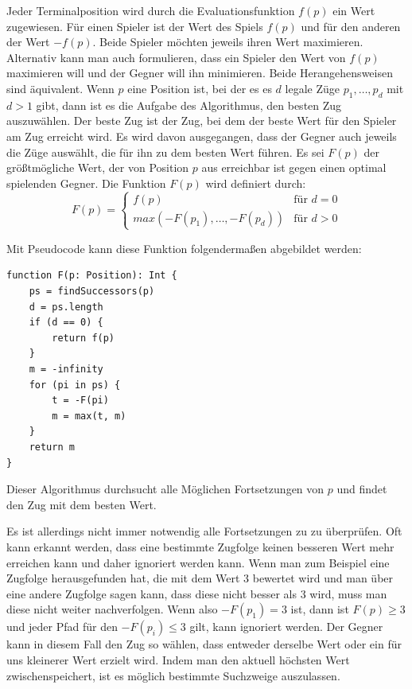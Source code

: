Jeder Terminalposition wird durch die Evaluationsfunktion $f(p)$ ein Wert zugewiesen. Für einen Spieler ist der Wert des Spiels $f(p)$ und für den anderen der Wert $-f(p)$. Beide Spieler möchten jeweils ihren Wert maximieren. Alternativ kann man auch formulieren, dass ein Spieler den Wert von $f(p)$ maximieren will und der Gegner will ihn minimieren.
Beide Herangehensweisen sind äquivalent. Wenn $p$ eine Position ist, bei der es es $d$ legale Züge $p_1,\ldots,p_d$ mit $d > 1$ gibt, dann ist es die Aufgabe des Algorithmus, den besten Zug auszuwählen. Der beste Zug ist der Zug, bei dem der beste Wert für den Spieler am Zug erreicht wird. Es wird davon ausgegangen, dass der Gegner auch jeweils die Züge auswählt, die für ihn zu dem besten Wert führen. Es sei $F(p)$ der größtmögliche Wert, der von Position $p$ aus erreichbar ist gegen einen optimal spielenden Gegner. Die Funktion $F(p)$ wird definiert durch:
\begin{equation*}
    F(p) = 
    \begin{cases}
        f(p) & \text{für } d = 0 \\
        max(-F(p_1),\ldots,-F(p_d)) & \text{für } d > 0
    \end{cases}
\end{equation*}

Mit Pseudocode kann diese Funktion folgendermaßen abgebildet werden:
\begin{lstlisting}[caption=Minimax-Algorithmus,label=lst:minmax]
function F(p: Position): Int {
    ps = findSuccessors(p)
    d = ps.length
    if (d == 0) {
        return f(p)
    }
    m = -infinity
    for (pi in ps) {
        t = -F(pi)
        m = max(t, m)
    }
    return m
}
\end{lstlisting}

Dieser Algorithmus durchsucht alle Möglichen Fortsetzungen von $p$ und findet den Zug mit dem besten Wert. 
\cite{knuth_analysis_1975}

Es ist allerdings nicht immer notwendig alle Fortsetzungen zu zu überprüfen. Oft kann erkannt werden, dass eine bestimmte Zugfolge keinen besseren Wert mehr erreichen kann und daher ignoriert werden kann.
Wenn man zum Beispiel eine Zugfolge herausgefunden hat, die mit dem Wert 3 bewertet wird und man über eine andere Zugfolge sagen kann, dass diese nicht besser als 3 wird, muss man diese nicht weiter nachverfolgen. Wenn also $-F(p_1) = 3$ ist, dann ist $F(p) \geq 3$ und jeder Pfad für den $-F(p_i) \leq 3$ gilt, kann ignoriert werden.
Der Gegner kann in diesem Fall den Zug so wählen, dass entweder derselbe Wert oder ein für uns kleinerer Wert erzielt wird. Indem man den aktuell höchsten Wert zwischenspeichert, ist es möglich bestimmte Suchzweige auszulassen.
\cite{knuth_analysis_1975}

